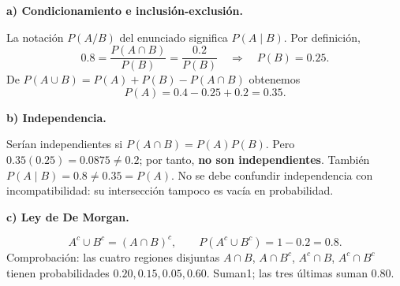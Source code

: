 \textbf{a) Condicionamiento e inclusión-exclusión.}\par\nopagebreak[4]
La notación $P(A/B)$ del enunciado significa $P(A\mid B)$. Por definición,
\[
0.8=\frac{P(A\cap B)}{P(B)}=\frac{0.2}{P(B)}
\quad\Longrightarrow\quad\boxed{P(B)=0.25}.
\]
De $P(A\cup B)=P(A)+P(B)-P(A\cap B)$ obtenemos
\[
\boxed{P(A)=0.4-0.25+0.2=0.35}.
\]

\textbf{b) Independencia.}\par\nopagebreak[4]
Serían independientes si $P(A\cap B)=P(A)P(B)$. Pero $0.35(0.25)=0.0875\ne0.2$; por tanto, \textbf{no son independientes}. También $P(A\mid B)=0.8\ne0.35=P(A)$. No se debe confundir independencia con incompatibilidad: su intersección tampoco es vacía en probabilidad.

\textbf{c) Ley de De Morgan.}\par\nopagebreak[4]
\[
A^c\cup B^c=(A\cap B)^c,\qquad
\boxed{P(A^c\cup B^c)=1-0.2=0.8}.
\]
Comprobación: las cuatro regiones disjuntas $A\cap B$, $A\cap B^c$, $A^c\cap B$, $A^c\cap B^c$ tienen probabilidades $0.20,0.15,0.05,0.60$. Suman1; las tres últimas suman 0.80.
